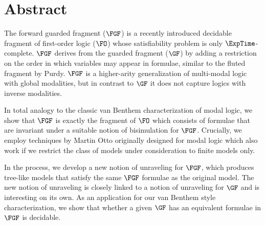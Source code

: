 \chapter*{Abstract}

\begingroup
\Large
\narrower
\narrower
The forward guarded fragment ($\FGF$) is a recently introduced decidable fragment of first-order logic ($\FO$) whose satisfiability problem is only $\ExpTime$-complete.
$\FGF$ derives from the guarded fragment ($\GF$) by adding a restriction on the order in which variables may appear in formulae, similar to the fluted fragment by Purdy.
$\FGF$ is a higher-arity generalization of multi-modal logic with global modalities, but in contrast to $\GF$ it does not capture logics with inverse modalities.

\baselineskip
\noindent
In total analogy to the classic van Benthem characterization of modal logic, we show that $\FGF$ is exactly the fragment of $\FO$ which consists of formulae that are invariant under a suitable notion of bisimulation for $\FGF$.
Crucially, we employ techniques by Martin Otto originally designed for modal logic which also work if we restrict the class of models under consideration to finite models only.

\baselineskip
\noindent
In the process, we develop a new notion of unraveling for $\FGF$, which produces tree-like models that satisfy the same $\FGF$ formulae as the original model.
The new notion of unraveling is closely linked to a notion of unraveling for $\GF$ and is interesting on its own.
As an application for our van Benthem style characterization, we show that whether a given $\GF$ has an equivalent formulae in $\FGF$ is decidable.

\endgroup

